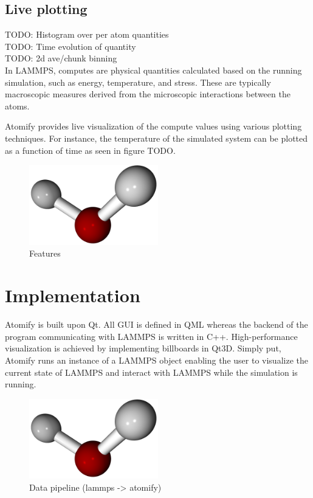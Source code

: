 \documentclass[aps,pre,twocolumn,letterpaper,floatfix]{revtex4}
\begin{document}
\subsection{Live plotting}
TODO: Histogram over per atom quantities \\
TODO: Time evolution of quantity \\
TODO: 2d ave/chunk binning \\

In LAMMPS, computes are physical quantities calculated based on the running
simulation, such as energy, temperature, and stress.
These are typically macroscopic measures derived from the microscopic
interactions between the atoms.

Atomify provides live visualization of the compute values using various plotting
techniques.
For instance, the temperature of the simulated system can be plotted as a
function of time as seen in figure TODO.

\begin{figure}
	\centering
	\includegraphics[width=0.5\textwidth]{final_billboard.png}
	\caption{Features}
	\label{fig:gui}
\end{figure}

\section{Implementation}

Atomify is built upon Qt.
All GUI is defined in QML whereas the backend of the program communicating with
LAMMPS is written in C++.
High-performance visualization is achieved by implementing billboards in Qt3D.
Simply put, Atomify runs an instance of a LAMMPS object enabling the user to
visualize the current state of LAMMPS and interact with LAMMPS while the
simulation is running. 

\begin{figure}
	\centering
	\includegraphics[width=0.5\textwidth]{final_billboard.png}
	\caption{Data pipeline (lammps -> atomify)}
	\label{fig:gui}
\end{figure}
\end{document}
